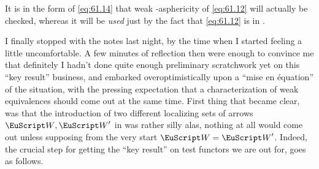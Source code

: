 It is in the form of \eqref{eq:61.14} that weak \scrW-asphericity of
\eqref{eq:61.12} will actually be checked, whereas it will be
\emph{used} just by the fact that \eqref{eq:61.12} is in \scrW.

\bigbreak
\presectionfill{}\par

\label{sec:62}%
I finally stopped with the notes last night, by the time when I
started feeling a little uncomfortable. A few minutes of reflection
then were enough to convince me that definitely I hadn't done quite
enough preliminary scratchwork yet on this ``key result'' business,
and embarked overoptimistically upon a ``mise en \'equation'' of the
situation, with the pressing expectation that a characterization of
weak equivalences should come out at the same time. First thing that
became clear, was that the introduction of two different localizing
sets of arrows $\scrW,\scrW'$ in \Cat{} was rather silly alas, nothing
at all would come out unless supposing from the very start
$\scrW=\scrW'$. Indeed, the crucial step for getting the ``key
result'' on test functors we are out for, goes as follows.

